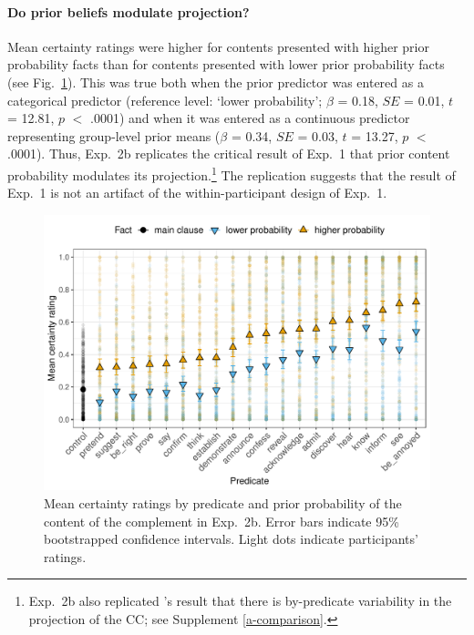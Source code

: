 \documentclass[11pt,fleqn]{article}
\newcommand{\figref}[1]{Fig.~\ref{#1}}
\newcommand{\6}{\mbox{$[\hspace*{-.6mm}[$}}
\newcommand{\9}{\mbox{$]\hspace*{-.6mm}]$}}
\newcommand{\citepos}[1]{\citeauthor{#1}'s \citeyear{#1}}
\begin{document}
\paragraph{Do prior beliefs modulate projection?} Mean certainty ratings were higher for contents  presented with higher prior probability facts than for contents presented with lower prior probability facts (see \figref{f-projection-mean-2b}). This was true both when the prior predictor was entered as a categorical predictor (reference level: `lower probability'; $\beta$ = 0.18, $SE$ = 0.01, $t$ = 12.81, $p$ $<$ .0001) and when it was entered as a continuous predictor representing group-level prior means ($\beta$ = 0.34, $SE$ = 0.03, $t$ = 13.27, $p$ $<$ .0001). Thus, Exp.~2b replicates the critical result of Exp.~1 that prior content probability modulates its projection.\footnote{Exp.~2b also replicated \citepos{tonhauser-degen-factive} result that there is by-predicate variability in the projection of the CC; see Supplement \ref{a-comparison}.}  The replication suggests that the result of Exp.~1 is not an artifact of the within-participant design of Exp.~1.

\begin{figure}[h!]
\centering

\includegraphics[width=.7\paperwidth]{../../results/3-projectivity/graphs/means-projectivity-by-predicate-and-prior}

\caption{Mean certainty ratings by predicate and prior probability of the content of the complement in Exp.~2b. Error bars indicate 95\% bootstrapped confidence intervals. Light dots indicate participants' ratings.} 
\label{f-projection-mean-2b}
\end{figure}
\end{document}
